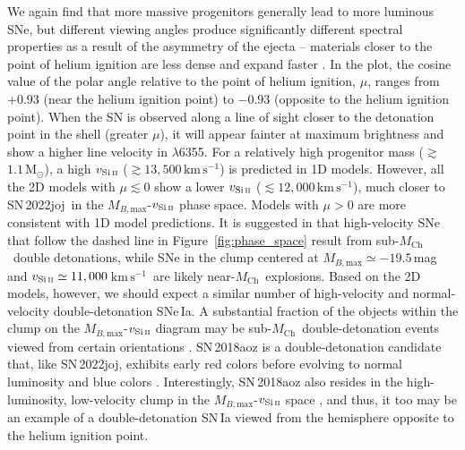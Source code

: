 \documentclass[twocolumn]{aastex631}
\newcommand{\sn}{SN\,2022joj}
\newcommand{\Mch}{$M_\mathrm{Ch}$}
\newcommand{\kms}{$\mathrm{km}\,\mathrm{s}^{-1}$}
\begin{document}
\begin{CJK*}{UTF8}{gbsn}
We again find that more massive progenitors generally lead to more luminous SNe, but different viewing angles produce significantly different spectral properties as a result of the asymmetry of the ejecta -- materials closer to the point of helium ignition are less dense and expand faster \citep{Shen_2D_2021}. In the plot, the cosine value of the polar angle relative to the point of helium ignition, $\mu$, ranges from $+0.93$ (near the helium ignition point) to $-0.93$ (opposite to the helium ignition point). When the SN is observed along a line of sight closer to the detonation point in the shell (greater $\mu$), it will appear fainter at maximum brightness and show a higher line velocity in  $\lambda$6355. For a relatively high progenitor mass ($\gtrsim$$1.1\,\mathrm{M_\odot}$), a high $v_\mathrm{Si\,\textsc{ii}}$ ($\gtrsim$$13,500$\,\kms) is predicted in 1D models. However, all the 2D models with $\mu\lesssim0$ show a lower $v_\mathrm{Si\,\textsc{ii}}$ ($\lesssim$$12,000$\,\kms), much closer to \sn\ in the $M_{B,\mathrm{max}}$-$v_\mathrm{Si\,\textsc{ii}}$ phase space. Models with $\mu>0$ are more consistent with 1D model predictions. It is suggested in \citet{polin_observational_2019} that high-velocity SNe that follow the dashed line in Figure~\ref{fig:phase_space} result from sub-\Mch\ double detonations, while SNe in the clump centered at $M_{B,\mathrm{max}}\simeq-19.5$\,mag and $v_\mathrm{Si\,\textsc{ii}}\simeq11,000$\,\kms\ are likely near-\Mch\ explosions. Based on the 2D models, however, we should expect a similar number of high-velocity and normal-velocity double-detonation SNe\,Ia. A substantial fraction of the objects within the clump on the $M_{B,\mathrm{max}}$-$v_\mathrm{Si\,\textsc{ii}}$ diagram may be sub-\Mch\ double-detonation events viewed from certain orientations \citep{Shen_2D_2021}. SN\,2018aoz is a double-detonation candidate that, like \sn, exhibits early red colors before evolving to normal luminosity and blue colors \citep{Ni_2022}. Interestingly, SN\,2018aoz also resides in the high-luminosity, low-velocity clump in the $M_{B,\mathrm{max}}$-$v_\mathrm{Si\,\textsc{ii}}$ space \citep{Ni_18aoz_2023}, and thus, it too may be an example of a double-detonation SN\,Ia viewed from the hemisphere opposite to the helium ignition point.


\end{CJK*}
\end{document}
